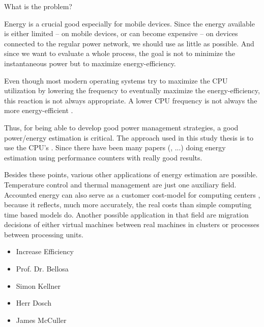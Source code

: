 
What is the problem?

Energy is a crucial good especially for mobile devices. Since the energy
available is either limited -- on mobile devices, or can become expensive --
on devices connected to the regular power network, we should use as little as
possible. And since we want to evaluate a whole process, the goal is not to
minimize the instantaneous power but to maximize energy-efficiency.

Even though most modern operating systems try to maximize the CPU utilization
by lowering the frequency \cite{snowdon2010operating} to eventually maximize the
energy-efficiency, this reaction is not always appropriate. A lower CPU
frequency is not always the more energy-efficient
\cite{weissel2002process,snowdon2010operating}.

Thus, for being able to develop good power management strategies, a good
power/energy estimation is critical. The approach used in this study thesis is
to use the CPU's .  Since
\cite{bellosa2000benefits} there have been many papers
(\cite{Bertran2010,bertran2010decomposable,kellner03tempcontrol,isci2003runtime,
weissel2002process}, ...) doing energy estimation using performance counters
with really good results.

Besides these points, various other applications of energy estimation are
possible. Temperature control \cite{kellner03tempcontrol} and thermal management
\cite{merkel05tmsmpsys} are just one auxiliary field. Accounted energy can also
serve as a customer cost-model for computing centers \cite{Bertran2010}, because
it reflects, much more accurately, the real costs than simple computing time
based models do. Another possible application in that field are migration
decisions \cite{merkel10rcscheduling} of either virtual machines between real
machines in clusters or processes between processing units.

\begin{itemize}

\item Increase Efficiency

\end{itemize}


\begin{itemize}

\item Prof. Dr. Bellosa

\item Simon Kellner

\item Herr Dosch

\item James McCuller

\end{itemize}

